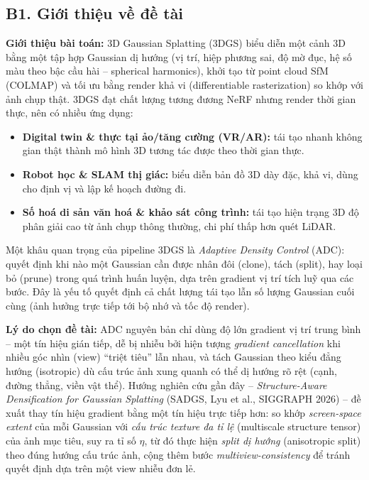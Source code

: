 \documentclass[a4paper,12pt]{article}
\begin{document}
\subsection*{B1. Giới thiệu về đề tài}

\textbf{Giới thiệu bài toán:} 3D Gaussian Splatting (3DGS) biểu diễn một cảnh 3D bằng một tập
hợp Gaussian dị hướng (vị trí, hiệp phương sai, độ mờ đục, hệ số màu theo bậc cầu hài -- spherical
harmonics), khởi tạo từ point cloud SfM (COLMAP) và tối ưu bằng render khả vi (differentiable
rasterization) so khớp với ảnh chụp thật. 3DGS đạt chất lượng tương đương NeRF nhưng render
thời gian thực, nên có nhiều ứng dụng:
\begin{itemize}[leftmargin=1.2em]
\item \textbf{Digital twin \& thực tại ảo/tăng cường (VR/AR):} tái tạo nhanh không gian thật
thành mô hình 3D tương tác được theo thời gian thực.
\item \textbf{Robot học \& SLAM thị giác:} biểu diễn bản đồ 3D dày đặc, khả vi, dùng cho định
vị và lập kế hoạch đường đi.
\item \textbf{Số hoá di sản văn hoá \& khảo sát công trình:} tái tạo hiện trạng 3D độ phân giải
cao từ ảnh chụp thông thường, chi phí thấp hơn quét LiDAR.
\end{itemize}

Một khâu quan trọng của pipeline 3DGS là \emph{Adaptive Density Control} (ADC): quyết định khi
nào một Gaussian cần được nhân đôi (clone), tách (split), hay loại bỏ (prune) trong quá trình
huấn luyện, dựa trên gradient vị trí tích luỹ qua các bước. Đây là yếu tố quyết định cả chất
lượng tái tạo lẫn số lượng Gaussian cuối cùng (ảnh hưởng trực tiếp tới bộ nhớ và tốc độ render).

\textbf{Lý do chọn đề tài:} ADC nguyên bản chỉ dùng độ lớn gradient vị trí trung bình -- một tín
hiệu gián tiếp, dễ bị nhiễu bởi hiện tượng \emph{gradient cancellation} khi nhiều góc nhìn (view)
``triệt tiêu'' lẫn nhau, và tách Gaussian theo kiểu đẳng hướng (isotropic) dù cấu trúc ảnh xung
quanh có thể dị hướng rõ rệt (cạnh, đường thẳng, viền vật thể). Hướng nghiên cứu gần đây --
\emph{Structure-Aware Densification for Gaussian Splatting} (SADGS, Lyu et al., SIGGRAPH 2026)
-- đề xuất thay tín hiệu gradient bằng một tín hiệu trực tiếp hơn: so khớp \emph{screen-space
extent} của mỗi Gaussian với \emph{cấu trúc texture đa tỉ lệ} (multiscale structure tensor) của
ảnh mục tiêu, suy ra tỉ số $\eta$, từ đó thực hiện \emph{split dị hướng} (anisotropic split) theo
đúng hướng cấu trúc ảnh, cộng thêm bước \emph{multiview-consistency} để tránh quyết định dựa
trên một view nhiễu đơn lẻ.
\end{document}
